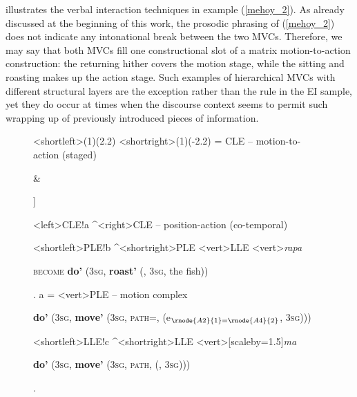  illustrates the verbal interaction techniques in example (\ref{mehoy_2}). As already discussed at the beginning of this work, the prosodic phrasing of (\ref{mehoy_2}) does not indicate any intonational break between the two MVCs. Therefore, we may say that both MVCs fill one constructional slot of a matrix motion-to-action construction: the returning hither covers the motion stage, while the sitting and roasting makes up the action stage. Such examples of hierarchical MVCs with different structural layers are the exception rather than the rule in the EI sample, yet they do occur at times when the discourse context seems to permit such wrapping up of previously introduced pieces of information.

\begin{figure}
\jtree[xunit=12em,yunit=2em]
<shortleft>(1)(2.2)
<shortright>(1)(-2.2)
\! = {CLE -- motion-to-action (staged)}
{\begin{scriptsize} [[ \textbf{do'} (3\textsc{sg}, \textbf{move'} (3\textsc{sg}, \textsc{path=come}, \textbf{return'} (e$_{1=2}$, 3\textsc{sg}))) ] \& \end{scriptsize}}
{\begin{scriptsize} ]\end{scriptsize}}
<left>{CLE}!a ^<right>{CLE -- position-action (co-temporal)}{\begin{scriptsize} \end{scriptsize}}
<shortleft>{PLE}!b ^<shortright>{PLE}
<vert>{LLE}
<vert>{\textit{rapa}}{\begin{scriptsize} \textsc{become} \textbf{do'} (3\textsc{sg}, \textbf{roast'} (, 3\textsc{sg}, the fish))\end{scriptsize}}.
\!a = <vert>{PLE -- motion complex}{\begin{scriptsize} \textbf{do'} (3\textsc{sg}, \textbf{move'} (3\textsc{sg}, \textsc{path=}, \textbf{} (e$_{\rnode{A2}{1}=\rnode{A4}{2}}$, 3\textsc{sg}))) \end{scriptsize}}
<shortleft>{LLE}!c ^<shortright>{LLE}
<vert>[scaleby=1.5]{\textit{ma}}
{\begin{scriptsize} \textbf{do'} (3\textsc{sg}, \textbf{move'} (3\textsc{sg}, \textsc{path}, \textbf{} (, 3\textsc{sg})))\end{scriptsize}}.

\end{figure}
